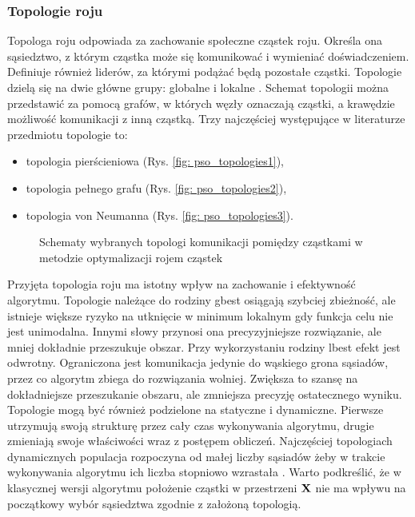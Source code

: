\subsubsection{Topologie roju}
Topologa roju odpowiada za zachowanie społeczne cząstek roju.  Określa ona sąsiedztwo, z którym cząstka może się komunikować i wymieniać doświadczeniem. Definiuje również liderów, za którymi podążać będą pozostałe cząstki. Topologie dzielą się na dwie główne grupy: globalne  i lokalne . Schemat topologii można przedstawić za pomocą grafów, w których węzły oznaczają cząstki, a krawędzie możliwość komunikacji z inną cząstką. Trzy najczęściej występujące w literaturze przedmiotu topologie to:
\begin{itemize}
	\item topologia pierścieniowa (Rys. \ref{fig: pso_topologies1}),
	\item topologia pełnego grafu (Rys. \ref{fig: pso_topologies2}),
	\item topologia von Neumanna (Rys. \ref{fig: pso_topologies3}).
\end{itemize}
\begin{figure}[h]
	\centering
	\captionsetup{justification=centering}
	\caption{Schematy wybranych topologi komunikacji pomiędzy cząstkami w metodzie optymalizacji rojem cząstek}
	\label{fig: pso_topologies}
\end{figure}
Przyjęta topologia roju ma istotny wpływ na zachowanie i efektywność algorytmu. Topologie należące do rodziny gbest osiągają szybciej zbieżność, ale istnieje większe ryzyko na utknięcie w minimum lokalnym gdy funkcja celu nie jest unimodalna. Innymi słowy przynosi ona precyzyjniejsze rozwiązanie, ale mniej dokładnie przeszukuje obszar. Przy wykorzystaniu rodziny lbest efekt jest odwrotny. Ograniczona jest komunikacja jedynie do wąskiego grona sąsiadów, przez co algorytm zbiega do rozwiązania wolniej. Zwiększa to szansę na dokładniejsze przeszukanie obszaru, ale zmniejsza precyzję ostatecznego wyniku. Topologie mogą być również podzielone na statyczne i dynamiczne. Pierwsze utrzymują swoją strukturę przez cały czas wykonywania algorytmu, drugie zmieniają swoje właściwości wraz z postępem obliczeń. Najczęściej topologiach dynamicznych populacja rozpoczyna od małej liczby sąsiadów żeby w trakcie wykonywania algorytmu ich liczba stopniowo wzrastała \parencite{Poli2007}. Warto podkreślić, że w klasycznej wersji algorytmu położenie cząstki w przestrzeni $\mathbf{X}$ nie ma wpływu na początkowy wybór sąsiedztwa zgodnie z założoną topologią.

